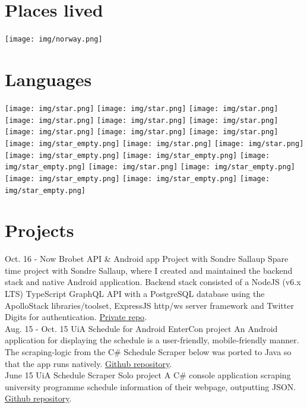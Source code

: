 \documentclass[]{cv-class}
\begin{document}
\begin{aside}
  \vspace{1cm}
  \section{Places lived}
    \texttt{[image: img/norway.png]}
    ~
  \section{Languages}
    {\texttt{[image: img/star.png]}
    \texttt{[image: img/star.png]}
    \texttt{[image: img/star.png]}
    \texttt{[image: img/star.png]}
    \texttt{[image: img/star.png]}}
    {\texttt{[image: img/star.png]}
    \texttt{[image: img/star.png]}
    \texttt{[image: img/star.png]}
    \texttt{[image: img/star.png]}
    \texttt{[image: img/star\_empty.png]}}
    {\texttt{[image: img/star.png]}
    \texttt{[image: img/star.png]}
    \texttt{[image: img/star\_empty.png]}
    \texttt{[image: img/star\_empty.png]}
    \texttt{[image: img/star\_empty.png]}}
    {\texttt{[image: img/star.png]}
    \texttt{[image: img/star\_empty.png]}
    \texttt{[image: img/star\_empty.png]}
    \texttt{[image: img/star\_empty.png]}
    \texttt{[image: img/star\_empty.png]}}
    ~
\end{aside}



\section{Projects}
\begin{entrylist}
  \entry
    {Oct. 16 - Now}
    {Brobet API \& Android app}
    {Project with Sondre Sallaup}
    {Spare time project with Sondre Sallaup, where I created and maintained
    the backend stack and native Android application.
    Backend stack consisted of a NodeJS (v6.x LTS) TypeScript GraphQL API with
    a PostgreSQL database using the ApolloStack libraries/toolset, ExpressJS http/ws server
    framework and Twitter Digits for authentication.
    \underline{Private repo}.\\}
  \entry
    {Aug. 15 - Oct. 15}
    {UiA Schedule for Android}
    {EnterCon project}
    {An Android application for displaying the schedule is a user-friendly,
    mobile-friendly manner. The scraping-logic from the C\# Schedule Scraper below
    was ported to Java so that the app runs natively.
    \underline{\href{https://github.com/EnterCon/UiA-Timeplan-Android}
    {Github repository}}.\\}
  \entry
    {June 15}
    {UiA Schedule Scraper}
    {Solo project}
    {A C\# console application scraping university programme schedule information
    of their webpage, outputting JSON.
    \underline{\href{https://github.com/EnterCon/UiA-ScheduleScraper}
    {Github repository}}.\\}
\end{entrylist}
\end{document}
